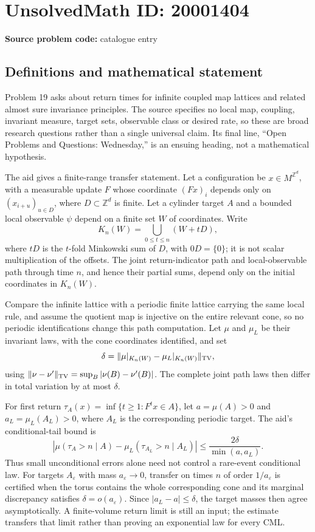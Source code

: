 \documentclass[11pt]{article}
\newcommand{\Z}{\mathbb{Z}}
\begin{document}
\section*{UnsolvedMath ID: 20001404}
\textbf{Source problem code:} catalogue entry
\subsection{Definitions and mathematical statement}
Problem 19 asks about return times for infinite coupled map lattices and related almost sure invariance principles. The source specifies no local map, coupling, invariant measure, target sets, observable class or desired rate, so these are broad research questions rather than a single universal claim. Its final line, ``Open Problems and Questions: Wednesday,'' is an ensuing heading, not a mathematical hypothesis.

The aid gives a finite-range transfer statement. Let a configuration be \(x\in M^{\Z^d}\), with a measurable update \(F\) whose coordinate \((Fx)_i\) depends only on \((x_{i+u})_{u\in D}\), where \(D\subset\Z^d\) is finite. Let a cylinder target \(A\) and a bounded local observable \(\psi\) depend on a finite set \(W\) of coordinates. Write
\[
K_n(W)=\bigcup_{0\le t\le n}(W+tD),
\]
where \(tD\) is the \(t\)-fold Minkowski sum of \(D\), with \(0D=\{0\}\); it is not scalar multiplication of the offsets. The joint return-indicator path and local-observable path through time \(n\), and hence their partial sums, depend only on the initial coordinates in \(K_n(W)\).

Compare the infinite lattice with a periodic finite lattice carrying the same local rule, and assume the quotient map is injective on the entire relevant cone, so no periodic identifications change this path computation. Let \(\mu\) and \(\mu_L\) be their invariant laws, with the cone coordinates identified, and set
\[
\delta=\|\mu|_{K_n(W)}-\mu_L|_{K_n(W)}\|_{\rm TV},
\]
using \(\|\nu-\nu'\|_{\rm TV}=\sup_B|\nu(B)-\nu'(B)|\). The complete joint path laws then differ in total variation by at most \(\delta\).

For first return \(\tau_A(x)=\inf\{t\ge1:F^tx\in A\}\), let \(a=\mu(A)>0\) and \(a_L=\mu_L(A_L)>0\), where \(A_L\) is the corresponding periodic target. The aid's conditional-tail bound is
\[
\left|\mu(\tau_A>n\mid A)-\mu_L(\tau_{A_L}>n\mid A_L)\right|
\le\frac{2\delta}{\min(a,a_L)}.
\]
Thus small unconditional errors alone need not control a rare-event conditional law. For targets \(A_\varepsilon\) with mass \(a_\varepsilon\to0\), transfer on times \(n\) of order \(1/a_\varepsilon\) is certified when the torus contains the whole corresponding cone and its marginal discrepancy satisfies \(\delta=o(a_\varepsilon)\). Since \(|a_L-a|\le\delta\), the target masses then agree asymptotically. A finite-volume return limit is still an input; the estimate transfers that limit rather than proving an exponential law for every CML.
\end{document}
